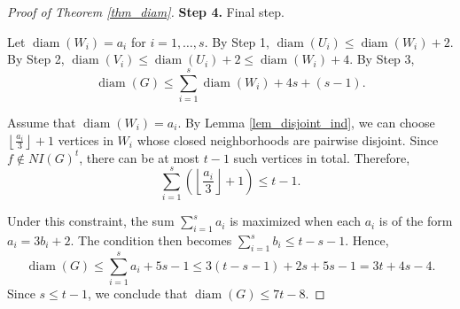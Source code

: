 \documentclass[10pt,a4paper]{amsart}
\DeclareMathOperator{\diam}{diam}
\begin{document}
\begin{proof}[Proof of Theorem \ref{thm_diam}]
\medskip

\noindent \textbf{Step 4.} Final step.

Let $\diam(W_i) = a_i$ for $i = 1, \ldots, s$. By Step 1, $\diam(U_i) \leq \diam(W_i) + 2$. By Step 2, $\diam(V_i) \leq \diam(U_i) + 2 \leq \diam(W_i) + 4$. By Step 3,
\[
\diam(G) \leq \sum_{i=1}^s \diam(W_i) + 4s + (s - 1).
\]

Assume that $\diam(W_i) = a_i$. By Lemma \ref{lem_disjoint_ind}, we can choose $\left\lfloor \frac{a_i}{3} \right\rfloor + 1$ vertices in $W_i$ whose closed neighborhoods are pairwise disjoint. Since $f \notin NI(G)^t$, there can be at most $t - 1$ such vertices in total. Therefore,
\[
\sum_{i=1}^s \left(\left\lfloor \frac{a_i}{3} \right\rfloor + 1\right) \leq t - 1.
\]

Under this constraint, the sum $\sum_{i=1}^s a_i$ is maximized when each $a_i$ is of the form $a_i = 3b_i + 2$. The condition then becomes $\sum_{i=1}^s b_i \leq t - s - 1$. Hence,
\[
\diam(G) \leq \sum_{i=1}^s a_i + 5s - 1 \leq 3(t - s - 1) + 2s + 5s - 1 = 3t + 4s - 4.
\]
Since $s \leq t - 1$, we conclude that $\diam(G) \leq 7t - 8$.
\end{proof}
\end{document}
